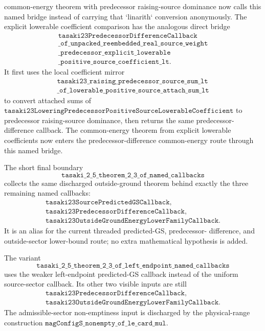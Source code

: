 \documentclass[a4paper,11pt]{article}
\begin{document}
common-energy theorem with predecessor raising-source dominance now calls this
named bridge instead of carrying that `linarith` conversion anonymously.
The explicit lowerable coefficient comparison has the analogous direct bridge
\[
\begin{gathered}
\texttt{tasaki23PredecessorDifferenceCallback}\\
\texttt{\_of\_unpacked\_reembedded\_real\_source\_weight}\\
\texttt{\_predecessor\_explicit\_lowerable}\\
\texttt{\_positive\_source\_coefficient\_lt}.
\end{gathered}
\]
It first uses the local coefficient mirror
\[
\begin{gathered}
\texttt{tasaki23\_raising\_predecessor\_source\_sum\_lt}\\
\texttt{\_of\_lowerable\_positive\_source\_attach\_sum\_lt}
\end{gathered}
\]
to convert attached sums of
\(\texttt{tasaki23LoweringPredecessorPositiveSourceLowerableCoefficient}\)
to predecessor raising-source dominance, then returns the same
predecessor-difference callback.  The common-energy theorem from explicit
lowerable coefficients now enters the predecessor-difference common-energy
route through this named bridge.

The short final boundary
\[
\texttt{tasaki\_2\_5\_theorem\_2\_3\_of\_named\_callbacks}
\]
collects the same discharged outside-ground theorem behind exactly the
three remaining named callbacks:
\[
\begin{gathered}
\texttt{tasaki23SourcePredictedGSCallback},\\
\texttt{tasaki23PredecessorDifferenceCallback},\\
\texttt{tasaki23OutsideGroundEnergyLowerFamilyCallback}.
\end{gathered}
\]
It is an alias for the current threaded predicted-GS, predecessor-
difference, and outside-sector lower-bound route; no extra mathematical
hypothesis is added.

The variant
\[
\texttt{tasaki\_2\_5\_theorem\_2\_3\_of\_left\_endpoint\_named\_callbacks}
\]
uses the weaker left-endpoint predicted-GS callback instead of the
uniform source-sector callback.  Its other two visible inputs are still
\[
\begin{gathered}
\texttt{tasaki23PredecessorDifferenceCallback},\\
\texttt{tasaki23OutsideGroundEnergyLowerFamilyCallback}.
\end{gathered}
\]
The admissible-sector non-emptiness input is discharged by the
physical-range construction
\(\texttt{magConfigS\_nonempty\_of\_le\_card\_mul}\).
\end{document}
